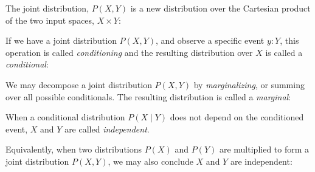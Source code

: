 \documentclass{article}
\begin{document}
%

The joint distribution, $P(X, Y)$ is a new distribution over the Cartesian product of the two input spaces, $X \times Y$:

\begin{prooftree}
\end{prooftree}

If we have a joint distribution $P(X, Y)$, and observe a specific event $y: Y$, this operation is called \textit{conditioning} and the resulting distribution over $X$ is called a \textit{conditional}:


\begin{prooftree}
\end{prooftree}

We may decompose a joint distribution $P(X, Y)$ by \textit{marginalizing}, or summing over all possible conditionals. The resulting distribution is called a \textit{marginal}:

\begin{prooftree}
\end{prooftree}

When a conditional distribution $P(X \mid Y)$ does not depend on the conditioned event, $X$ and $Y$ are called \textit{independent}.

\begin{prooftree}
\end{prooftree}


Equivalently, when two distributions $P(X)$ and $P(Y)$ are multiplied to form a joint distribution $P(X, Y)$, we may also conclude $X$ and $Y$ are independent:
\end{document}
